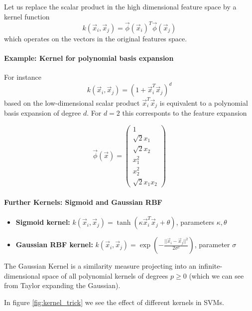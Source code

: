 Let us replace the scalar product in the high dimensional feature space by a kernel function
\begin{equation}
    k(\vec{x}_i, \vec{x}_j) = \vec{\phi}(\vec{x}_i)^T \vec{\phi}(\vec{x}_j)
\end{equation}
which operates on the vectors in the original features space.

\paragraph*{Example: Kernel for polynomial basis expansion}
For instance
\begin{equation}
    k(\vec{x}_i, \vec{x}_j) = (1 + \vec{x}_i^T \vec{x}_j)^d
\end{equation}
based on the low-dimensional scalar product $\vec{x}_i^T \vec{x}_j$ is equivalent to a 
polynomial basis expansion of degree $d$. For $d = 2$ this corresponts to the
feature expansion

\begin{equation}
    \vec{\phi}(\vec{x}) = \begin{pmatrix}
    1 \\ \sqrt{2} x_1 \\ \sqrt{2} x_2 \\ x_1^2 \\ x_2^2 \\ \sqrt{2} x_1 x_2
    \end{pmatrix}
\end{equation}

\paragraph*{Further Kernels: Sigmoid and Gaussian RBF}
\begin{itemize}
    \item \textbf{Sigmoid kernel:} $k(\vec{x}_i, \vec{x}_j) = \tanh(\kappa \vec{x}_i^T \vec{x}_j + \theta)$, parameters $\kappa, \theta$
    \item \textbf{Gaussian RBF kernel:} $k(\vec{x}_i, \vec{x}_j) = \exp\left(-\frac{||\vec{x}_i - \vec{x}_j||^2}{2\sigma^2}\right)$, parameter $\sigma$
\end{itemize}
The Gaussian Kernel is a similarity measure projecting 
into an infinite-dimensional space of all polynomial kernels 
of degrees $p \geq 0$ (which we can see from Taylor 
expanding the Gaussian).

In figure \ref{fig:kernel_trick} we see the effect of different kernels in SVMs.

